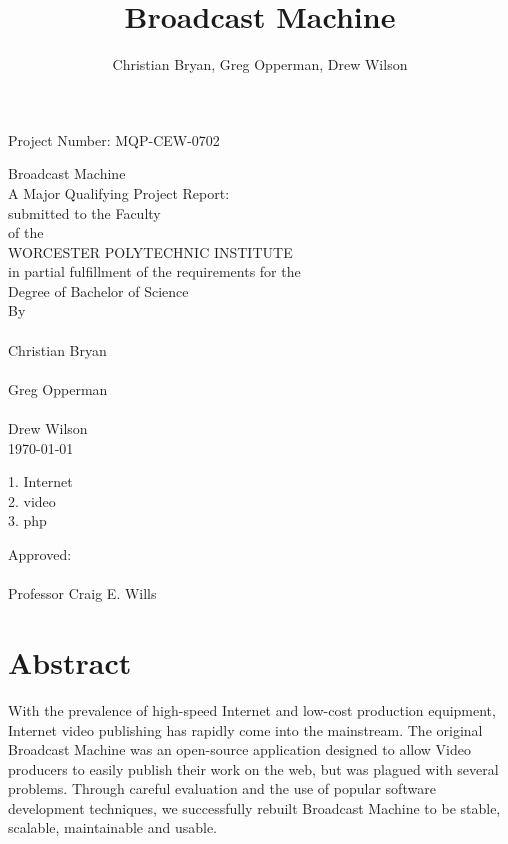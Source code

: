 \documentclass[a4paper,12pt]{report}
\title{Broadcast Machine}
\author{Christian Bryan, Greg Opperman, Drew Wilson}
\begin{document}
\begin{titlepage}
  \topmargin 0.5in
  \headheight 0in
\begin{center}
  \begin{flushright}
Project Number: MQP-CEW-0702\\
\end{flushright}
\vspace*{40mm}
Broadcast Machine\\
A Major Qualifying Project Report:\\
submitted to the Faculty\\
of the\\
WORCESTER POLYTECHNIC INSTITUTE\\
in partial fulfillment of the requirements for the\\
Degree of Bachelor of Science\\
By\\
\makebox[2in]{\hrulefill}\\
Christian Bryan\\
\vspace*{10mm}
\makebox[2in]{\hrulefill}\\
Greg Opperman\\
\vspace*{10mm}
\makebox[2in]{\hrulefill}\\
Drew Wilson\\
\vspace*{10mm}
\today\\
\vspace*{10mm}
\begin{flushleft}
  1. Internet\\
  2. video\\
  3. php\\
\end{flushleft}
\begin{flushright}
Approved:\\
\vspace*{10mm}
\makebox[2in]{\hrulefill}\\
Professor Craig E. Wills\\
\end{flushright}
\end{center}
\end{titlepage}

\chapter*{Abstract}
With the prevalence of high-speed Internet and low-cost production equipment, Internet video publishing has rapidly come into the 
mainstream.
The original Broadcast Machine was an open-source application designed to allow Video producers to easily publish their work on the web, but was plagued with several problems.
Through careful evaluation and the use of popular software development techniques, we successfully rebuilt Broadcast Machine to be stable, scalable, maintainable and usable.
\end{document}

